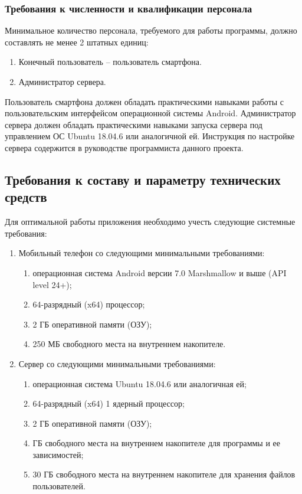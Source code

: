 \documentclass[a4paper,12pt,reqno]{article}
\begin{document}
  \subsubsection{Требования к численности и квалификации персонала}
  Минимальное количество персонала, требуемого для работы программы, должно составлять не менее 2 штатных единиц:
  \begin{enumerate}
    \item Конечный пользователь -- пользователь смартфона.
    \item Администратор сервера.
  \end{enumerate}
  Пользователь смартфона должен обладать практическими навыками работы с пользовательским интерфейсом операционной системы Android.
  Администратор сервера должен обладать практическими навыками запуска сервера под управлением ОС Ubuntu 18.04.6 или аналогичной ей.
  Инструкция по настройке сервера содержится в руководстве программиста данного проекта.

  \subsection{Требования к составу и параметру технических средств}
  Для оптимальной работы приложения необходимо учесть следующие системные требования:

  \begin{enumerate}
    \item Мобильный телефон со следующими минимальными требованиями:
    \begin{enumerate}
      \item операционная система Android версии 7.0 Marshmallow и выше (API level 24+);
      \item 64-разрядный (x64) процессор;
      \item 2 ГБ оперативной памяти (ОЗУ);
      \item 250 МБ свободного места на внутреннем накопителе.
    \end{enumerate}
    \item Сервер со следующими минимальными требованиями:
    \begin{enumerate}
      \item операционная система Ubuntu 18.04.6 или аналогичная ей;
      \item 64-разрядный (x64) 1 ядерный процессор;
      \item 2 ГБ оперативной памяти (ОЗУ);
      \item ГБ свободного места на внутреннем накопителе для программы и ее зависимостей;
      \item 30 ГБ свободного места на внутреннем накопителе для хранения файлов пользователей.
    \end{enumerate}
  \end{enumerate}
\end{document}
